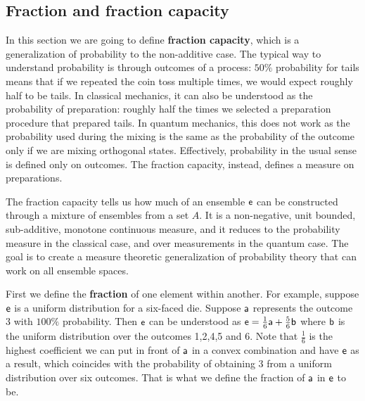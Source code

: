 \subsection{Fraction and fraction capacity}


In this section we are going to define \textbf{fraction capacity}, which is a generalization of probability to the non-additive case. The typical way to understand probability is through outcomes of a process: $50\%$ probability for tails means that if we repeated the coin toss multiple times, we would expect roughly half to be tails. In classical mechanics, it can also be understood as the probability of preparation: roughly half the times we selected a preparation procedure that prepared tails. In quantum mechanics, this does not work as the probability used during the mixing is the same as the probability of the outcome only if we are mixing orthogonal states. Effectively, probability in the usual sense is defined only on outcomes. The fraction capacity, instead, defines a measure on preparations.

The fraction capacity tells us how much of an ensemble $\ens$ can be constructed through a mixture of ensembles from a set $A$. It is a non-negative, unit bounded, sub-additive, monotone continuous measure, and it reduces to the probability measure in the classical case, and over measurements in the quantum case. The goal is to create a measure theoretic generalization of probability theory that can work on all ensemble spaces.

First we define the \textbf{fraction} of one element within another. For example, suppose $\ens$ is a uniform distribution for a six-faced die. Suppose $\ens[a]$ represents the outcome 3 with $100\%$ probability. Then $\ens$ can be understood as $\ens = \frac{1}{6} \ens[a] + \frac{5}{6} \ens[b]$ where $\ens[b]$ is the uniform distribution over the outcomes 1,2,4,5 and 6. Note that $\frac{1}{6}$ is the highest coefficient we can put in front of $\ens[a]$ in a convex combination and have $\ens$ as a result, which coincides with the probability of obtaining 3 from a uniform distribution over six outcomes. That is what we define the fraction of $\ens[a]$ in $\ens$ to be.


